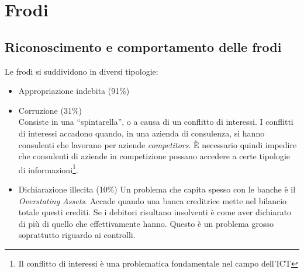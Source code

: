 \chapter{Frodi}

\section{Riconoscimento e comportamento delle frodi}

Le frodi si suddividono in diversi tipologie:

\begin{itemize}
	\item Appropriazione indebita (91\%)
	\item Corruzione (31\%) \\
	Consiste in una ``spintarella'', o a causa di un conflitto di interessi. I 
	conflitti di interessi accadono quando, in una azienda di consulenza, si 
	hanno consulenti che lavorano per aziende \textit{competitors}. È necessario 
	quindi impedire che consulenti di aziende in competizione possano accedere a 
	certe tipologie di informazioni\footnote{Il conflitto di interessi è una 
	problematica fondamentale nel campo dell'ICT}.
	\item Dichiarazione illecita (10\%)
	Un problema che capita spesso con le banche è il \textit{Overstating Assets}. 
	Accade quando una banca creditrice mette nel bilancio totale questi crediti. 
	Se i debitori risultano insolventi è come aver dichiarato di più di quello 
	che effettivamente hanno. Questo è un problema grosso soprattutto riguardo ai 
	controlli.
\end{itemize}